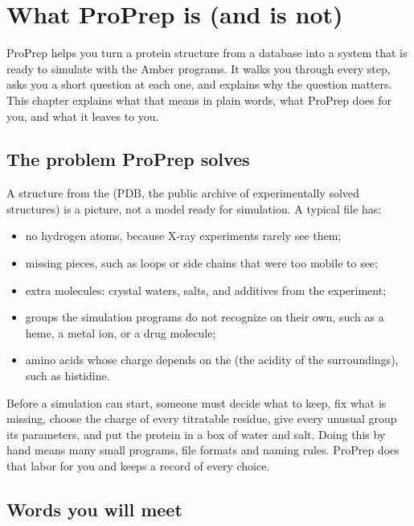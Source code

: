 \chapter{What ProPrep is (and is not)}
\label{ch:whatis}

ProPrep helps you turn a protein structure from a database into a system that
is ready to simulate with the Amber programs. It walks you through every step,
asks you a short question at each one, and explains why the question matters.
This chapter explains what that means in plain words, what ProPrep does for you,
and what it leaves to you.

\section{The problem ProPrep solves}
\label{sec:whatis-problem}

A structure from the  (PDB, the public archive of
experimentally solved structures) is a picture, not a model ready for
simulation. A typical file has:
\begin{itemize}
  \item no hydrogen atoms, because X-ray experiments rarely see them;
  \item missing pieces, such as loops or side chains that were too mobile to
        see;
  \item extra molecules: crystal waters, salts, and additives from the
        experiment;
  \item groups the simulation programs do not recognize on their own, such as
        a heme, a metal ion, or a drug molecule;
  \item amino acids whose charge depends on the  (the acidity of the
        surroundings), such as histidine.
\end{itemize}

Before a simulation can start, someone must decide what to keep, fix what is
missing, choose the charge of every titratable residue, give every unusual
group its parameters, and put the protein in a box of water and salt. Doing this
by hand means many small programs, file formats and naming rules. ProPrep does
that labor for you and keeps a record of every choice.

\section{Words you will meet}
\label{sec:whatis-words}

